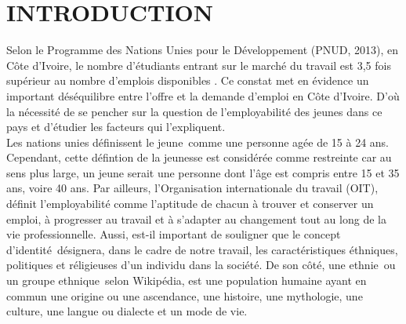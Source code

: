\documentclass[12pt,a4paper, openany]{book}
\begin{document}
	
	\mainmatter
	
	\chapter{INTRODUCTION}  

\noindent Selon le Programme des Nations Unies pour le Développement (PNUD, 2013), en Côte d'Ivoire, le nombre d'étudiants entrant sur le marché du travail est 3,5 fois supérieur au nombre d'emplois disponibles \parencite{franccoisuniversites}. Ce constat met en évidence un important déséquilibre entre l'offre et la demande d'emploi en Côte d'Ivoire. D'où la nécessité de se pencher sur la question de l'employabilité des jeunes dans ce pays et d'étudier les facteurs qui l'expliquent.\\ 

\noindent Les nations unies définissent le \guillemetleft jeune\guillemetright\ comme une personne agée de 15 à 24 ans. Cependant, cette défintion de la jeunesse est considérée comme restreinte car au sens plus large, un jeune serait une personne dont l'âge est compris entre 15 et 35 ans, voire 40 ans. Par ailleurs, l'Organisation internationale du travail (OIT), définit l'employabilité comme l'aptitude de chacun à trouver et conserver un emploi, à progresser au travail et à s'adapter au changement tout au long de la vie professionnelle. Aussi, est-il important de souligner que le concept d'\guillemetleft identité\guillemetright\ désignera, dans le cadre de notre travail, les caractéristiques éthniques, politiques et réligieuses d'un individu dans la société. De son côté, \guillemetleft une ethnie\guillemetright\ ou \guillemetleft un groupe ethnique\guillemetright\, selon Wikipédia, est une population humaine ayant en commun une origine ou une ascendance, une histoire, une mythologie, une culture, une langue ou dialecte et un mode de vie.\\
\end{document}
